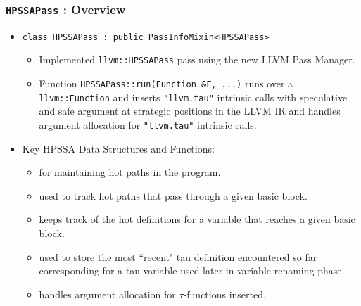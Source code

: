 \documentclass[aspectratio=169, compress]{beamer}
\begin{document}
\begin{frame}
	\frametitle{\texttt{HPSSAPass} : Overview}
	\begin{itemize}
		\item \texttt{class HPSSAPass : public PassInfoMixin<HPSSAPass>}
		\begin{itemize}
			\footnotesize
			\item Implemented \texttt{llvm::HPSSAPass} pass using the new LLVM Pass Manager. 
			\item Function \texttt{HPSSAPass::run(Function &F, ...)}  runs over a \texttt{llvm::Function} and inserts \texttt{"llvm.tau"} intrinsic calls with speculative and safe argument at strategic positions in the LLVM IR and handles argument allocation for \texttt{"llvm.tau"} intrinsic calls. \pause
		\end{itemize}
		\item Key HPSSA Data Structures and Functions:  \pause
		\begin{itemize}
			\footnotesize
			\item {} \pause for maintaining \color{red} hot paths \color{black} in the program. \pause
			\item {} \pause used to track \color{red} hot paths \color{black} that pass through a given basic block. \pause
			\item {} \pause keeps track of the \color{red} hot \color{black} definitions for a variable that reaches a given basic block. \pause
			\item {} \pause used to store the most ``recent" tau definition encountered so far corresponding for a tau variable used later in variable renaming phase. \pause
			\item {} handles argument allocation for $\tau$-functions inserted.
		\end{itemize}
	\end{itemize}
\end{frame}
\end{document}
